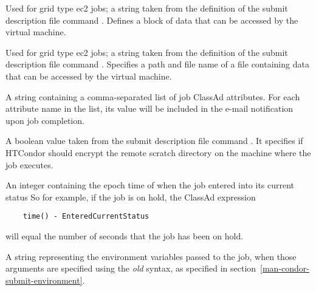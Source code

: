 \begin{description}
\item[\AdAttr{EC2UserData}:] 
Used for grid type ec2 jobs;
a string taken from the definition of the submit description file command
.
Defines a block of data that can be accessed by the virtual machine.

\item[\AdAttr{EC2UserDataFile}:] 
Used for grid type ec2 jobs;
a string taken from the definition of the submit description file command
.
Specifies a path and file name of a file containing 
data that can be accessed by the virtual machine.

\item[\AdAttr{EmailAttributes}:]  A string containing a comma-separated
list of job ClassAd attributes. For each attribute name in the list,
its value will be included in the e-mail notification upon job completion.

\item[\AdAttr{EncryptExecuteDirectory}:]
A boolean value taken from the submit description file command
. 
It specifies if HTCondor should encrypt the remote scratch directory 
on the machine where the job executes.

\item[\AdAttr{EnteredCurrentStatus}:]  An integer containing the
epoch time of when the job entered into its current status
So for example, if the job is on hold, the ClassAd expression
\begin{verbatim}
    time() - EnteredCurrentStatus
\end{verbatim}
will equal the number of seconds that the job has been on hold.

\item[\AdAttr{Env}:]  A string representing the environment variables 
passed to the job, when those arguments are specified using the
\emph{old} syntax, as specified in section~\ref{man-condor-submit-environment}.


\end{description}
